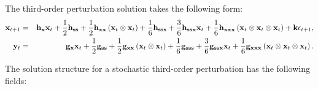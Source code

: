 \documentclass[notitlepage,11pt]{article}
\begin{document}
The third-order perturbation solution takes the following form:%
\begin{eqnarray*}
\mathbf{x}_{t+1} &=&\mathbf{h}_{\mathbf{x}}\mathbf{x}_{t}+\frac{1}{2}\mathbf{%
h}_{\mathbf{ss}}+\frac{1}{2}\mathbf{h}_{\mathbf{xx}}\left( \mathbf{x}%
_{t}\otimes \mathbf{x}_{t}\right) +\frac{1}{6}\mathbf{h}_{\mathbf{sss}}+%
\frac{3}{6}\mathbf{h}_{\mathbf{ssx}}\mathbf{x}_{t}+\frac{1}{6}\mathbf{h}_{%
\mathbf{xxx}}\left( \mathbf{x}_{t}\otimes \mathbf{x}_{t}\otimes \mathbf{x}%
_{t}\right) +\mathbf{k\epsilon }_{t+1}, \\
\mathbf{y}_{t} &=&\mathbf{g}_{\mathbf{x}}\mathbf{x}_{t}+\frac{1}{2}\mathbf{g}%
_{\mathbf{ss}}+\frac{1}{2}\mathbf{g}_{\mathbf{xx}}\left( \mathbf{x}%
_{t}\otimes \mathbf{x}_{t}\right) +\frac{1}{6}\mathbf{g}_{\mathbf{sss}}+%
\frac{3}{6}\mathbf{g}_{\mathbf{ssx}}\mathbf{x}_{t}+\frac{1}{6}\mathbf{g}_{%
\mathbf{xxx}}\left( \mathbf{x}_{t}\otimes \mathbf{x}_{t}\otimes \mathbf{x}%
_{t}\right) .
\end{eqnarray*}

The solution structure for a stochastic third-order perturbation has the
following fields:
\end{document}
